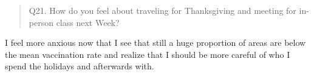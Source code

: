 \documentclass[
]{article}
\begin{document}
\begin{quote}
Q21. How do you feel about traveling for Thanksgiving and meeting for
in-person class next Week?
\end{quote}

I feel more anxious now that I see that still a huge proportion of areas
are below the mean vaccination rate and realize that I should be more
careful of who I spend the holidays and afterwards with.
\end{document}
